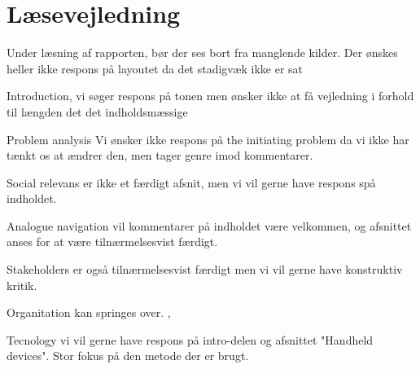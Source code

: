 \documentclass[article,11pt]{memoir}
\begin{document}
\chapter{Læsevejledning}

Under læsning af rapporten, bør der ses bort fra manglende kilder.
Der ønskes heller ikke respons på layoutet da det stadigvæk ikke er sat 

Introduction, vi søger respons på tonen men ønsker ikke at få vejledning i forhold til længden det det indholdsmæssige

Problem analysis
Vi ønsker ikke respons på the initiating problem da vi ikke har tænkt os at ændrer den, men tager genre imod kommentarer. 

Social relevans er ikke et færdigt afsnit, men vi vil gerne have respons spå indholdet. 

Analogue navigation vil kommentarer på indholdet være velkommen, og afsnittet anses for at være tilnærmelsesvist færdigt.

Stakeholders er også tilnærmelsesvist færdigt men vi vil gerne have konstruktiv kritik.

Organitation kan springes over. ,

Tecnology vi vil gerne have respons på intro-delen og afsnittet "Handheld devices". Stor fokus på den metode der er brugt.
\end{document}
